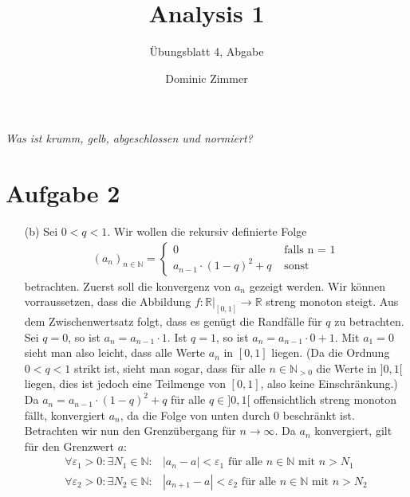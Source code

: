 \documentclass{scrreprt}
\newcommand{\NN}{\mathbb{N}}
\newcommand{\RR}{\mathbb{R}}
\begin{document}
	\title{Analysis 1}
 	\author{Dominic Zimmer}
 	\subtitle{Übungsblatt 4, Abgabe}
 	\publishers{Übungsgruppe: Rami Ahmad}
  	\maketitle 


	\emph{Was ist krumm, gelb, abgeschlossen und normiert?}

	\section*{Aufgabe 2}
	\begin{enumerate}[(a)]
		\item[(b)]
			Sei $0 < q < 1$. Wir wollen die rekursiv definierte Folge
			\begin{align*}
				(a_n)_{n \in \NN} = \begin{cases}0 &\text{ falls n = 1}\\ a_{n-1} \cdot (1-q)^2 + q &\text{ sonst}\end{cases}
			\end{align*}
			betrachten. Zuerst soll die konvergenz von $a_n$ gezeigt werden. Wir können vorraussetzen, dass die Abbildung $f \colon \RR |_{[0,1]} \to \RR$ streng monoton steigt. Aus dem Zwischenwertsatz folgt, dass es genügt die Randfälle für $q$ zu betrachten.
			Sei $q=0$, so ist $a_n = a_{n-1} \cdot 1$. Ist $q=1$, so ist $a_n = a_{n-1} \cdot 0 + 1$. Mit $a_1 = 0$ sieht man also leicht, dass alle Werte $a_n$ in $[0,1]$ liegen. (Da die Ordnung $0 < q< 1$ strikt ist, sieht man sogar, dass für alle $n \in \NN_{>0}$ die Werte in $]0,1[$ liegen, dies ist jedoch eine Teilmenge von $[0,1]$, also keine Einschränkung.) Da $a_n = a_{n-1} \cdot (1-q)^2 + q$ für alle $q \in ]0,1[$ offensichtlich streng monoton fällt, konvergiert $a_n$, da die Folge von unten durch $0$ beschränkt ist.\\
			Betrachten wir nun den Grenzübergang für $n \to \infty$. Da $a_n$ konvergiert, gilt für den Grenzwert $a$:
			\begin{align*}
				\forall \varepsilon_1 > 0: \exists N_1 \in \NN: &|a_n - a| < \varepsilon_1 \text{ für alle $n \in \NN$ mit $n > N_1$}\\
				\forall \varepsilon_2 > 0: \exists N_2 \in \NN: &|a_{n+1} - a| < \varepsilon_2 \text{ für alle $n \in \NN$ mit $n > N_2$}
			\end{align*}

\end{enumerate}
\end{document}
